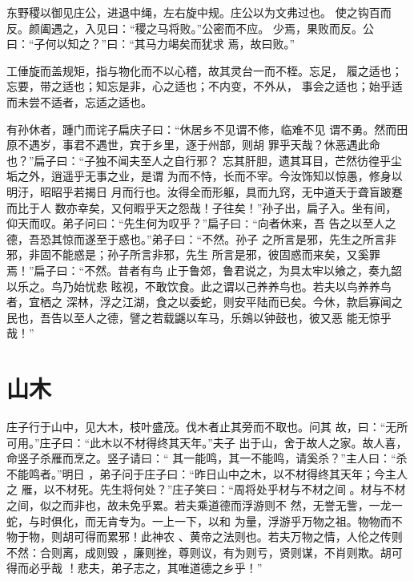 \documentclass[12pt,UTF8]{ctexbook}
\begin{document}
东野稷以御见庄公，进退中绳，左右旋中规。庄公以为文弗过也。 使之钩百而反。颜阖遇之，入见曰：“稷之马将败。”公密而不应。 少焉，果败而反。公曰：“子何以知之？”曰：“其马力竭矣而犹求 焉，故曰败。”

工倕旋而盖规矩，指与物化而不以心稽，故其灵台一而不桎。忘足， 履之适也；忘要，带之适也；知忘是非，心之适也；不内变，不外从， 事会之适也；始乎适而未尝不适者，忘适之适也。

有孙休者，踵门而诧子扁庆子曰：“休居乡不见谓不修，临难不见 谓不勇。然而田原不遇岁，事君不遇世，宾于乡里，逐于州部，则胡 罪乎天哉？休恶遇此命也？”扁子曰：“子独不闻夫至人之自行邪？ 忘其肝胆，遗其耳目，芒然彷徨乎尘垢之外，逍遥乎无事之业，是谓 为而不恃，长而不宰。今汝饰知以惊愚，修身以明汙，昭昭乎若揭日 月而行也。汝得全而形躯，具而九窍，无中道夭于聋盲跛蹇而比于人 数亦幸矣，又何暇乎天之怨哉！子往矣！”孙子出，扁子入。坐有间， 仰天而叹。弟子问曰：“先生何为叹乎？”扁子曰∶“向者休来，吾 告之以至人之德，吾恐其惊而遂至于惑也。”弟子曰：“不然。孙子 之所言是邪，先生之所言非邪，非固不能惑是；孙子所言非邪，先生 所言是邪，彼固惑而来矣，又奚罪焉！”扁子曰：“不然。昔者有鸟 止于鲁郊，鲁君说之，为具太牢以飨之，奏九韶以乐之。鸟乃始忧悲 眩视，不敢饮食。此之谓以己养养鸟也。若夫以鸟养养鸟者，宜栖之 深林，浮之江湖，食之以委蛇，则安平陆而已矣。今休，款启寡闻之 民也，吾告以至人之德，譬之若载鼷以车马，乐鴳以钟鼓也，彼又恶 能无惊乎哉！”
\section{山木}

庄子行于山中，见大木，枝叶盛茂。伐木者止其旁而不取也。问其 故，曰：“无所可用。”庄子曰：“此木以不材得终其天年。”夫子 出于山，舍于故人之家。故人喜，命竖子杀雁而烹之。竖子请曰：“ 其一能鸣，其一不能鸣，请奚杀？”主人曰：“杀不能鸣者。”明日 ，弟子问于庄子曰：“昨日山中之木，以不材得终其天年；今主人之 雁，以不材死。先生将何处？”庄子笑曰：“周将处乎材与不材之间 。材与不材之间，似之而非也，故未免乎累。若夫乘道德而浮游则不 然，无誉无訾，一龙一蛇，与时俱化，而无肯专为。一上一下，以和 为量，浮游乎万物之祖。物物而不物于物，则胡可得而累邪！此神农 、黄帝之法则也。若夫万物之情，人伦之传则不然：合则离，成则毁 ，廉则挫，尊则议，有为则亏，贤则谋，不肖则欺。胡可得而必乎哉 ！悲夫，弟子志之，其唯道德之乡乎！”
\end{document}
